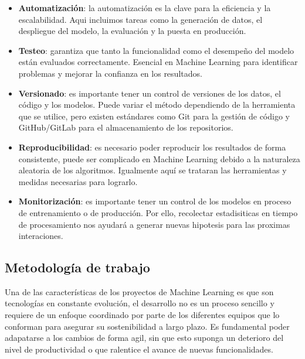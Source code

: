 \begin{itemize}
    \item \textbf{Automatización}: la automatización es la clave para la eficiencia y la escalabilidad.
          Aqui incluimos tareas como la generación de datos, el despliegue del modelo, la evaluación y
          la puesta en producción.
    \item \textbf{Testeo}: garantiza que tanto la funcionalidad como el desempeño del modelo están evaluados correctamente.
          Esencial en Machine Learning para identificar problemas y mejorar la confianza en los resultados.
    \item \textbf{Versionado}: es importante tener un control de versiones de los datos, el código y los modelos.
          Puede variar el método dependiendo de la herramienta que se utilice, pero existen estándares como Git para la gestión
          de código y GitHub/GitLab para el almacenamiento de los repositorios.
    \item \textbf{Reproducibilidad}: es necesario poder reproducir los resultados de forma consistente, puede ser
          complicado en Machine Learning debido a la naturaleza aleatoria de los algoritmos. Igualmente aquí se trataran
          las herramientas y medidas necesarias para lograrlo.
    \item \textbf{Monitorización}: es importante tener un control de los modelos en proceso de entrenamiento o de producción.
          Por ello, recolectar estadisiticas en tiempo de procesamiento nos ayudará a generar nuevas hipotesis para las proximas interaciones.
\end{itemize}

\subsection{Metodología de trabajo}
Una de las características de los proyectos de Machine Learning es que son tecnologías en constante evolución, el
desarrollo no es un proceso sencillo y requiere de un enfoque coordinado por parte de los diferentes
equipos que lo conforman para asegurar su sostenibilidad a largo plazo. Es fundamental poder adapatarse a los cambios
de forma agil, sin que esto suponga un deterioro del nivel de productividad o que ralentice el avance de nuevas
funcionalidades.\medskip

